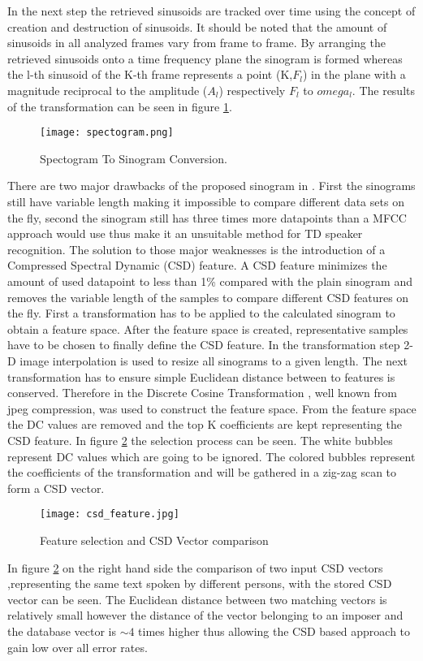\documentclass[12pt]{article}
\begin{document}
In the next step the retrieved sinusoids are tracked over time using the concept of creation and destruction of sinusoids. It should be noted that the amount of sinusoids in all analyzed frames vary from frame to frame. By arranging the retrieved sinusoids onto a time frequency plane the sinogram is formed whereas the l-th sinusoid of the K-th frame represents a point (K,\(F_{l}\)) in the plane with a magnitude reciprocal to the amplitude (\(A_{l}\)) respectively \(F_{l}\) to \(omega_{l}\). The results of the transformation can be seen in figure \ref{fig:sinogram}.
\newpage
\begin{figure}[h!]
	\texttt{[image: spectogram.png]}
	\caption[Spectogram To Sinogram Conversion Taken from: \cite{sinogram} ]{Spectogram To Sinogram Conversion.}
	\label{fig:sinogram}
\end{figure}
There are two major drawbacks of the proposed sinogram in \cite{sinogram}. First the sinograms still have variable length making it impossible to compare different data sets on the fly, second the sinogram still has three times more datapoints than a MFCC approach would use thus make it an unsuitable method for TD speaker recognition. 
The solution to those major weaknesses is the introduction of a Compressed Spectral Dynamic (CSD) feature. A CSD feature minimizes the amount of used datapoint to less than 1\% compared with the plain sinogram and removes the variable length of the samples to compare different CSD features on the fly.\cite{sinogram}
First a transformation has to be applied to the calculated sinogram to obtain a feature space. After the feature space is created, representative samples have to be chosen to finally define the CSD feature. 
In the transformation step 2-D image interpolation is used to resize all sinograms to a given length. The next transformation has to ensure simple Euclidean distance between to features is conserved. Therefore in \cite{sinogram} the Discrete Cosine Transformation , well known from jpeg compression, was used to construct the feature space. From the feature space the DC values are removed and the top K coefficients are kept representing the CSD feature. In figure \ref{fig:CSD} the selection process can be seen. The white bubbles represent DC values which are going to be ignored. The colored bubbles represent the coefficients of the transformation and will be gathered in a zig-zag scan to form a CSD vector.
\begin{figure}[h!]
	\texttt{[image: csd\_feature.jpg]}
	\caption[Spectogram To Sinogram Conversion Taken from: \cite{sinogram} ]{Feature selection and CSD Vector comparison}
	\label{fig:CSD}
\end{figure}  
In figure \ref{fig:CSD} on the right hand side the comparison of two input CSD vectors ,representing the same text spoken by different persons, with the stored CSD vector can be seen. The Euclidean distance between two matching vectors is relatively small however the distance of the vector belonging to an imposer and the database vector is \(\sim4\) times higher thus allowing the CSD  based approach to gain low over all error rates.
\end{document}
